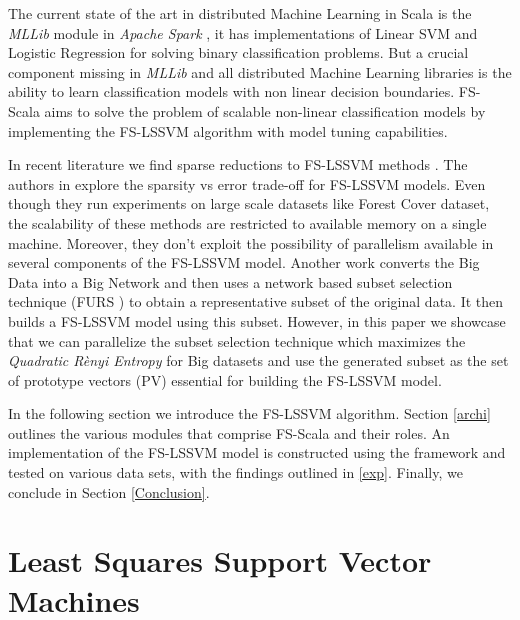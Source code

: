 \documentclass[conference, cmex10]{IEEEtran}
\begin{document}
The current state of the art in distributed Machine Learning in Scala is the \textit{MLLib} module in \textit{Apache Spark} \cite{Meng}, it has implementations of Linear SVM and Logistic Regression for solving binary classification problems. But a crucial component missing in \textit{MLLib} and all distributed Machine Learning libraries is the ability to learn classification models with non linear decision boundaries. FS-Scala aims to solve the problem of scalable non-linear classification models by implementing the FS-LSSVM algorithm with model tuning capabilities.  

In recent literature we find sparse reductions to FS-LSSVM methods \cite{Mall2015,Mall2013}. The authors in \cite{Mall2015,Mall2013} explore the sparsity vs error trade-off for FS-LSSVM models. Even though they run experiments on large scale datasets like Forest Cover dataset, the scalability of these methods are restricted to available memory on a single machine. Moreover, they don't exploit the possibility of parallelism available in several components of the FS-LSSVM model. Another work \cite{Mall2014} converts the Big Data into a Big Network and then uses a network based subset selection technique (FURS \cite{Mall2013FURS}) to obtain a representative subset of the original data. It then builds a FS-LSSVM model using this subset. However, in this paper we showcase that we can parallelize the subset selection technique which maximizes the \textit{Quadratic R\`enyi Entropy} for Big datasets and use the generated subset as the set of prototype vectors (PV) essential for building the FS-LSSVM model.

In the following section we introduce the FS-LSSVM algorithm\cite{DeBrabanter2010}. Section \ref{archi} outlines the various modules that comprise FS-Scala and their roles. An implementation of the FS-LSSVM model is constructed using the framework and tested on various data sets, with the findings outlined in \ref{exp}. Finally, we conclude in Section \ref{Conclusion}.
\section{Least Squares Support Vector Machines}
\end{document}
